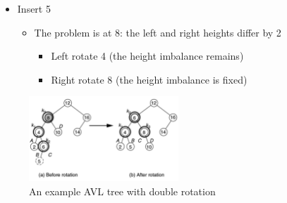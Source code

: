 \documentclass[
  10pt,
  english,
  letterpaper,
,tablecaptionabove
]{scrartcl}
\providecommand{\tightlist}{%
  \setlength{\itemsep}{0pt}\setlength{\parskip}{0pt}}
\begin{document}
\begin{itemize}
\tightlist
\item
  Insert 5

  \begin{itemize}
  \tightlist
  \item
    The problem is at 8: the left and right heights differ by 2

    \begin{itemize}
    \tightlist
    \item
      Left rotate 4 (the height imbalance remains)
    \item
      Right rotate 8 (the height imbalance is fixed)
    \end{itemize}
  \end{itemize}
\end{itemize}

\begin{figure}
\centering
\includegraphics[width=0.5\textwidth,height=\textheight]{images/12.png}
\caption{An example AVL tree with double rotation}
\end{figure}
\end{document}
